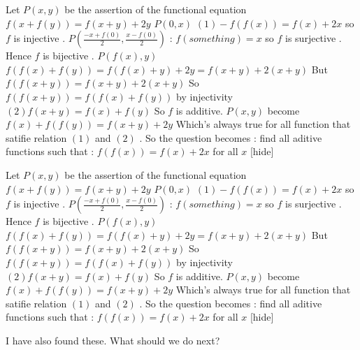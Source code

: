 


\begin{solution}
Let $P(x,y)$ be the assertion of the functional equation $f(x+f(y))=f(x+y)+2y$
$P(0,x)$ $(1)-f(f(x))=f(x)+2x$ so $f$ is injective .
$P(\frac{-x+f(0)}{2},\frac{x-f(0)}{2})$ : $ f(something)=x$ so $f$ is surjective .
Hence $f$ is bijective .
$P(f(x),y)$ $f(f(x)+f(y))=f(f(x)+y)+2y=f(x+y)+2(x+y)$
But $f(f(x+y))=f(x+y)+2(x+y)$
So $f(f(x+y))=f(f(x)+f(y))$ by injectivity $(2)f(x+y)=f(x)+f(y)$
So $f$ is additive.
$P(x,y)$ become $f(x)+f(f(y))=f(x+y)+2y$
Which's always true for all function that satifie relation $(1)$ and $(2)$ .
So the question becomes :
find all aditive functions such that :
$f(f(x))=f(x)+2x$ for all $x$ 
[\/hide]
\end{solution}



\begin{solution}
	\begin{tcolorbox}[hide="hint"]
Let $P(x,y)$ be the assertion of the functional equation $f(x+f(y))=f(x+y)+2y$
$P(0,x)$ $(1)-f(f(x))=f(x)+2x$ so $f$ is injective .
$P(\frac{-x+f(0)}{2},\frac{x-f(0)}{2})$ : $ f(something)=x$ so $f$ is surjective .
Hence $f$ is bijective .
$P(f(x),y)$ $f(f(x)+f(y))=f(f(x)+y)+2y=f(x+y)+2(x+y)$
But $f(f(x+y))=f(x+y)+2(x+y)$
So $f(f(x+y))=f(f(x)+f(y))$ by injectivity $(2)f(x+y)=f(x)+f(y)$
So $f$ is additive.
$P(x,y)$ become $f(x)+f(f(y))=f(x+y)+2y$
Which's always true for all function that satifie relation $(1)$ and $(2)$ .
So the question becomes :
find all aditive functions such that :
$f(f(x))=f(x)+2x$ for all $x$ 
[\/hide]\end{tcolorbox}
I have also found these. What should we do next?
\end{solution}



